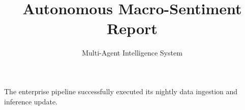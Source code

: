 \documentclass{article}
\title{Autonomous Macro-Sentiment Report}
\author{Multi-Agent Intelligence System}
\begin{document}
\maketitle
The enterprise pipeline successfully executed its nightly data ingestion and inference update.
\end{document}
